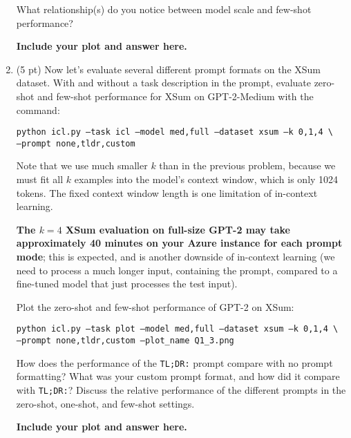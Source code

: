 \documentclass[12pt]{article}
\begin{document}
\begin{enumerate}
    What relationship(s) do you notice between model scale and few-shot performance?
        
    \textbf{\color{red}Include your plot and answer here.}

    \item (5 pt) Now let's evaluate several different prompt formats on the XSum dataset. With and without a task description in the prompt, evaluate zero-shot and few-shot performance for XSum on GPT-2-Medium with the command:

    \texttt{\small python icl.py --task icl --model med,full --dataset xsum --k 0,1,4 \textbackslash \\
    \phantom{asdf}--prompt none,tldr,custom}
    
    Note that we use much smaller $k$ than in the previous problem, because we must fit all $k$ examples into the model's context window, which is only 1024 tokens. The fixed context window length is one limitation of in-context learning.
    
    \textbf{The $k=4$ XSum evaluation on full-size GPT-2 may take approximately 40 minutes on your Azure instance for each prompt mode}; this is expected, and is another downside of in-context learning (we need to process a much longer input, containing the prompt, compared to a fine-tuned model that just processes the test input).
    
    Plot the zero-shot and few-shot performance of GPT-2 on XSum:
    
    \texttt{\small python icl.py --task plot --model med,full --dataset xsum --k 0,1,4 \textbackslash \\
    \phantom{asdf}--prompt none,tldr,custom --plot\_name Q1\_3.png}
    
    How does the performance of the \texttt{TL;DR:} prompt compare with no prompt formatting? What was your custom prompt format, and how did it compare with \texttt{TL;DR:}? Discuss the relative performance of the different prompts in the zero-shot, one-shot, and few-shot settings.
    
    \textbf{\color{red}Include your plot and answer here.}

\end{enumerate}
\end{document}
